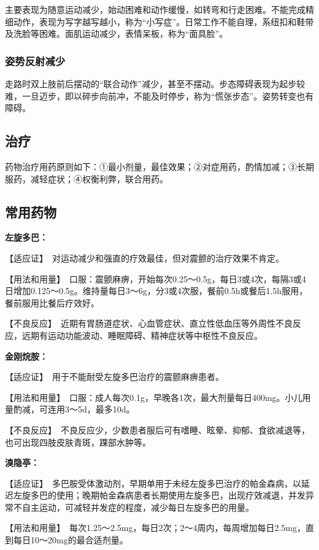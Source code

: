 主要表现为随意运动减少，始动困难和动作缓慢，如转弯和行走困难。不能完成精细动作，表现为写字越写越小，称为“小写症”。日常工作不能自理，系纽扣和鞋带及洗脸等困难。面肌运动减少，表情呆板，称为“面具脸”。

\subsubsection{姿势反射减少}

走路时双上肢前后摆动的“联合动作”减少，甚至不摆动。步态障碍表现为起步较难，一旦迈步，即以碎步向前冲，不能及时停步，称为“慌张步态”。姿势转变也有障碍。

\subsection{治疗}

药物治疗用药原则如下：①最小剂量，最佳效果；②对症用药，酌情加减；③长期服药，减轻症状；④权衡利弊，联合用药。

\subsection{常用药物}

\textbf{左旋多巴：}

【适应证】　对运动减少和强直的疗效最佳，但对震颤的治疗效果不肯定。

【用法和用量】　口服：震颤麻痹，开始每次0.25～0.5g，每日3或4次，每隔3或4日增加0.125～0.5g。维持量每日3～6g，分3或4次服，餐前0.5h或餐后1.5h服用，餐前服用比餐后疗效好。

【不良反应】　近期有胃肠道症状、心血管症状、直立性低血压等外周性不良反应，远期有运动功能波动、睡眠障碍、精神症状等中枢性不良反应。

\textbf{金刚烷胺：}

【适应证】　用于不能耐受左旋多巴治疗的震颤麻痹患者。

【用法和用量】　口服：成人每次0.1g，早晚各1次，最大剂量每日400mg。小儿用量酌减，可连用3～5d，最多10d。

【不良反应】　不良反应少，少数患者服后可有嗜睡、眩晕、抑郁、食欲减退等，也可出现四肢皮肤青斑，踝部水肿等。

\textbf{溴隐亭：}

【适应证】　多巴胺受体激动剂，早期单用于未经左旋多巴治疗的帕金森病，以延迟左旋多巴的使用；晚期帕金森病患者长期使用左旋多巴，出现疗效减退，并发异常不自主运动，可减轻并发症的程度，减少每日左旋多巴的用量。

【用法和用量】　每次1.25～2.5mg，每日2次；2～4周内，每周增加每日2.5mg，直到每日10～20mg的最合适剂量。

